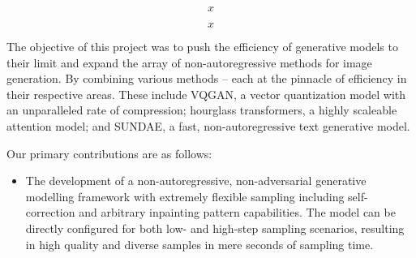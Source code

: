 \documentclass[14pt,margin=0.5in,innermargin=0in,blockverticalspace=-0.1in,colspace=-1.0cm]{tikzposter}
\begin{document}
\begin{columns}
{\begin{tcolorbox}[boxsep=0pt,top=0cm,adjusted title={\Large Proposed Method},colbacktitle=colorOne]
        \begin{minipage}{0.49\linewidth}
        \begin{equation}
            x
        \end{equation}
        \end{minipage}
        \begin{minipage}{0.49\linewidth}
        \begin{equation}
            x
        \end{equation}
        \end{minipage}
        \vspace{1cm}
        
        \large
        The objective of this project was to push the efficiency of generative
        models to their limit and expand the array of non-autoregressive methods
        for image generation. By combining various methods -- each at the
        pinnacle of efficiency in their respective areas. These include VQGAN, a
        vector quantization model with an unparalleled rate of compression;
        hourglass transformers, a highly scaleable attention model; and SUNDAE,
        a fast, non-autoregressive text generative model.

        Our primary contributions are as follows:
        \begin{itemize}
            \item
                The development of a non-autoregressive, non-adversarial
                generative modelling framework with extremely flexible sampling
                including self-correction and arbitrary inpainting pattern
                capabilities. The model can be directly configured for both low-
                and high-step sampling scenarios, resulting in high quality and
                diverse samples in mere seconds of sampling time.


\end{itemize}
\end{tcolorbox}}
\end{columns}
\end{document}
